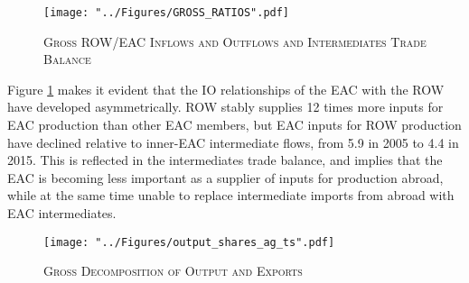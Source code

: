 \documentclass[a4paper]{article}
\begin{document}
\begin{figure}[h!]
\centering
\caption{\label{fig:GR}\textsc{Gross ROW/EAC Inflows and Outflows and Intermediates Trade Balance}}
\texttt{[image: "../Figures/GROSS\_RATIOS".pdf]} %
\end{figure}
\FloatBarrier

Figure \ref{fig:GR} makes it evident that the IO relationships of the EAC with the ROW have developed asymmetrically. ROW stably supplies 12 times more inputs for EAC production than other EAC members, but EAC inputs for ROW production have declined relative to inner-EAC intermediate flows, from 5.9 in 2005 to 4.4 in 2015. This is reflected in the intermediates trade balance, and implies that the EAC is becoming less important as a supplier of inputs for production abroad, while at the same time unable to replace intermediate imports from abroad with EAC intermediates. %


\begin{figure}[h!]
\centering
\caption{\label{fig:outshares_ag_ts}\textsc{Gross Decomposition of Output and Exports}}
\texttt{[image: "../Figures/output\_shares\_ag\_ts".pdf]} %
\vspace{-1.1cm}
\end{figure}
\FloatBarrier
\end{document}
